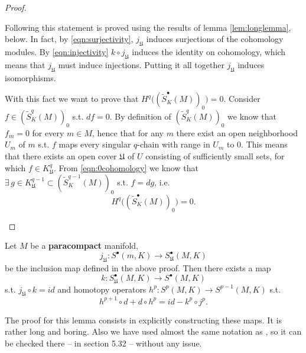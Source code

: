 \begin{proof}
\begin{description}
			Following \cite{warner} this statement is proved using the results of lemma \ref{lem:longlemma}, below.
			In fact, by \eqref{eqn:surjectivity}, $j_\mathfrak{U}$ induces surjections of the cohomology modules.
			By \eqref{eqn:injectivity} $k \circ j_\mathfrak{U}$ induces the identity on cohomology, which means that $j_\mathfrak{U}$ must induce injections.
			Putting it all together $j_\mathfrak{U}$ induces isomorphisms.

			With this fact we want to prove that $H^q \big((\widetilde{S}^\bullet_K(M))_0\big) = 0$.
			Consider $f \in (\widetilde{S}^q_K(M))_0$ s.t. $df = 0$.
			By definition of $(\widetilde{S}^q_K(M))_0$ we know that $f_m = 0$ for every $m \in M$, hence that for any  $m$ there exist an open neighborhood $U_m$ of $m$ s.t. $f$ maps every singular $q$-chain with range in $U_m$ to $0$.
			This means that there exists an open cover $\mathfrak{U}$ of $U$ consisting of sufficiently small sets, for which $f \in K^q_\mathfrak{U}$.
			From \eqref{eqn:0cohomology} we know that $\exists\, g \in K^{q-1}_\mathfrak{U} \subset (\widetilde{S}^{q-1}_K(M))_0$ s.t. $f = dg$, i.e. 
			\begin{equation}
				H^q \big((\widetilde{S}^\bullet_K(M))_0\big) = 0
			.\end{equation}
	\end{description} 
\end{proof}

\begin{lem}\label{lem:longlemma}
	Let $M$ be a \textbf{paracompact} manifold,
	\begin{equation}
		j_\mathfrak{U}: S^\bullet(m,K) \to S^\bullet_\mathfrak{U}(M,K)	
	\end{equation} 
	be the inclusion map defined in the above proof.
	Then there exists a map 
	\begin{equation}\label{eqn:surjectivity}
		k: S^\bullet_\mathfrak{U}(M,K) \to S^\bullet(M,K)	
	\end{equation} 
	s.t. $j_\mathfrak{U} \circ k = id$ and homotopy operators $h^p: S^p(M,K) \to S^{p-1}(M,K)$ s.t.
	\begin{equation}\label{eqn:injectivity}
		h^{p+1} \circ d + d \circ h^p = id - k^p \circ j^p
	.\end{equation} 
\end{lem} 
The proof for this lemma consists in explicitly constructing these maps.
It is rather long and boring.
Also we have used almost the same notation as \cite{warner}, so it can be checked there -- in section 5.32 -- without any issue.

